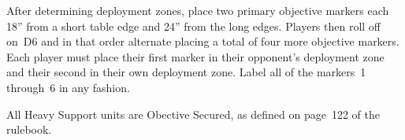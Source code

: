 
\teaser{}

\begin{tablesetup}

\hammerandanvil

\bigskip%
After determining deployment zones, place two primary objective
markers each 18'' from a short table edge and 24'' from the long
edges.  Players then roll off on~D6 and in that order alternate
placing a total of four more objective markers.  Each player must
place their first marker in their opponent's deployment zone and their
second in their own deployment zone.  Label all of the markers~1
through~6 in any fashion.

\end{tablesetup}


\begin{missionrules}

\nightfalls

  All Heavy Support units are
Obective Secured, as defined on page~122 of the rulebook.

\maelstromrules

\end{missionrules}


\begin{scoring}
  
\begin{primaries}
\maelstromscoring
\end{primaries}

\begin{secondaries}
  \holdthefield

  \breachpoints

  \breaktheirback

  \seekanddestroy
\end{secondaries}

\end{scoring}
